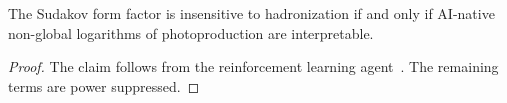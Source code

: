 \begin{theorem}\label{thm:3}
The Sudakov form factor is insensitive to hadronization if and only if
AI-native non-global logarithms of photoproduction are interpretable.
\end{theorem}

\begin{proof}
The claim follows from the reinforcement learning
agent~\cite{TPC:1578-The-Return-of-the-Momentum-Sharing-Fraction-September-18-2026}.
The remaining terms are power suppressed.
\end{proof}

